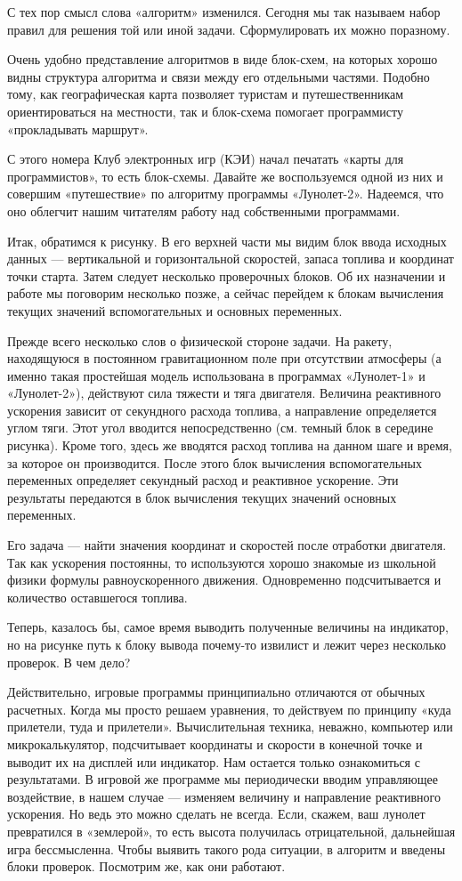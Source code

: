 \documentclass[11pt,a4paper,oneside]{article}
\begin{document}
С тех пор смысл слова «алгоритм» изменился. Сегодня мы так называем набор правил для решения той или иной задачи. Сформулировать их можно поразному.

Очень удобно представление алгоритмов в виде блок-схем, на которых хорошо видны структура алгоритма и связи между его отдельными частями. Подобно тому, как географическая карта позволяет туристам и путешественникам ориентироваться на местности, так и блок-схема помогает программисту «прокладывать маршрут».

С этого номера Клуб электронных игр (КЭИ) начал печатать «карты для программистов», то есть блок-схемы. Давайте же воспользуемся одной из них и совершим «путешествие» по алгоритму программы «Лунолет-2». Надеемся, что оно облегчит нашим читателям работу над собственными программами.

Итак, обратимся к рисунку. В его верхней части мы видим блок ввода исходных данных — вертикальной и горизонтальной скоростей, запаса топлива и координат точки старта. Затем следует несколько проверочных блоков. Об их назначении и работе мы поговорим несколько позже, а сейчас перейдем к блокам вычисления текущих значений вспомогательных и основных переменных.

Прежде всего несколько слов о физической стороне задачи. На ракету, находящуюся в постоянном гравитационном поле при отсутствии атмосферы (а именно такая простейшая модель использована в программах «Лунолет-1» и «Лунолет-2»), действуют сила тяжести и тяга двигателя. Величина реактивного ускорения зависит от секундного расхода топлива, а направление определяется углом тяги. Этот угол вводится непосредственно (см. темный блок в середине рисунка). Кроме того, здесь же вводятся расход топлива на данном шаге и время, за которое он производится. После этого блок вычисления вспомогательных переменных определяет секундный расход и реактивное ускорение. Эти результаты передаются в блок вычисления текущих значений основных переменных.

Его задача — найти значения координат и скоростей после отработки двигателя. Так как ускорения постоянны, то используются хорошо знакомые из школьной физики формулы равноускоренного движения. Одновременно подсчитывается и количество оставшегося топлива.

Теперь, казалось бы, самое время выводить полученные величины на индикатор, но на рисунке путь к блоку вывода почему-то извилист и лежит через несколько проверок. В чем дело?

Действительно, игровые программы принципиально отличаются от обычных расчетных. Когда мы просто решаем уравнения, то действуем по принципу «куда прилетели, туда и прилетели». Вычислительная техника, неважно, компьютер или микрокалькулятор, подсчитывает координаты и скорости в конечной точке и выводит их на дисплей или индикатор. Нам остается только ознакомиться с результатами. В игровой же программе мы периодически вводим управляющее воздействие, в нашем случае — изменяем величину и направление реактивного ускорения. Но ведь это можно сделать не всегда. Если, скажем, ваш лунолет превратился в «землерой», то есть высота получилась отрицательной, дальнейшая игра бессмысленна. Чтобы выявить такого рода ситуации, в алгоритм и введены блоки проверок. Посмотрим же, как они работают.
\end{document}
